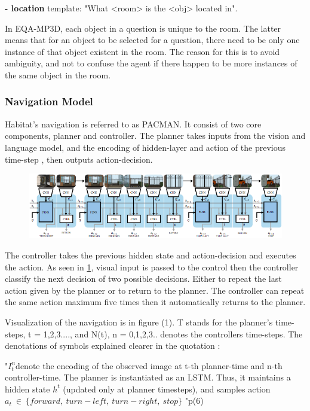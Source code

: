 \textbf{- location} template: "What <room> is the <obj> located in". 

In EQA-MP3D, each object in a question is unique to the room. The latter means that for an object to be selected for a question, there need to be only one instance of that object existent in the room. The reason for this is to avoid ambiguity, and not to confuse the agent if there happen to be more instances of the same object in the room. 





\subsubsection{Navigation Model}


Habitat's navigation is referred to as PACMAN. It consist of two core components, planner and controller. The planner takes inputs from the vision and language model, and the encoding of hidden-layer and action of the previous time-step , then outputs action-decision. 

\begin{figure}[H]
\includegraphics[scale=0.53]{images/nav.png}
\caption{}
\label{fig:nav}
\end{figure}

The controller takes the previous hidden state and action-decision and executes the action. As seen in \ref{fig:nav}, visual input is passed to the control then the controller classify the next decision of two possible decisions. Either to repeat the last action given by the planner or to return to the planner. The controller can repeat the same action maximum five times then it automatically returns to the planner. 

Visualization of the navigation is in figure (1). T stands for the planner's time-steps, t = 1,2,3...., and N(t),  n = 0,1,2,3.. denotes the controllers time-steps. The denotations of symbols explained clearer in the quotation : 


"\begin{math}  I_{t}^{n} \end{math}denote the encoding of the observed image at t-th planner-time and n-th controller-time. The planner is instantiated as an LSTM. Thus, it maintains a hidden state \begin{math} h^{t}\end{math}
(updated only at planner timesteps), and samples action 
\begin{math}  a_{t} \ \in \ \{forward,\ turn-left,\ turn-right,\ stop\} \end{math} "p(6)
\vspace{0.3cm}

